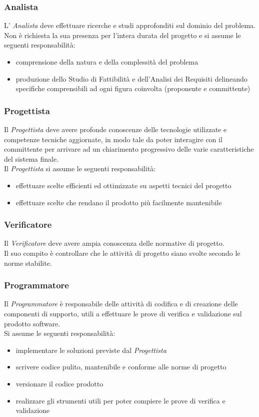 \subsubsection{Analista}
L' \emph{Analista}  deve effettuare ricerche e studi approfonditi sul
dominio del problema. Non è richiesta la sua presenza per l'intera
durata del progetto e si assume le seguenti responsabilità: 
\begin{itemize}
	\item comprensione della natura e della complessità del problema
	\item produzione dello Studio di Fattibilità e
	dell'Analisi dei Requisiti delineando specifiche comprensibili
	ad ogni figura coinvolta (proponente e committente)
\end{itemize}
\subsubsection{Progettista}
Il  \emph{Progettista}  deve avere profonde conoscenze delle
tecnologie utilizzate e competenze tecniche aggiornate, in modo tale
da poter interagire con il committente per arrivare ad un chiarimento 
progressivo delle varie caratteristiche del sistema finale.\\Il  \emph{Progettista}  si assume le seguenti responsabilità:
\begin{itemize}
	\item effettuare scelte efficienti ed ottimizzate su aspetti tecnici del progetto
	\item effettuare scelte che rendano il prodotto più facilmente mantenibile
\end{itemize}
\subsubsection{Verificatore}
Il  \emph{Verificatore}  deve avere ampia conoscenza delle normative di progetto.\\Il suo compito è controllare che le attività di progetto siano svolte secondo le norme stabilite.
\subsubsection{Programmatore}
Il  \emph{Programmatore}  è responsabile delle attività di codifica e di creazione delle componenti di supporto, utili a effettuare le prove di verifica e validazione sul prodotto software.\\
Si assume le seguenti responsabilità:
\begin{itemize}
	\item implementare le soluzioni previste dal  \emph{Progettista} 
	\item scrivere codice pulito, mantenibile  e conforme alle norme di progetto
	\item versionare il codice prodotto
	\item realizzare gli strumenti utili per poter compiere le prove di verifica e validazione
\end{itemize}

